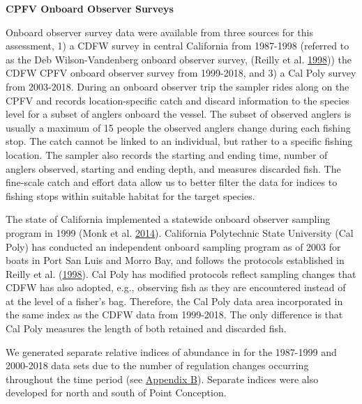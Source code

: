 \documentclass[12pt,]{article}
\begin{document}
\textbf{CPFV Onboard Observer Surveys}

Onboard observer survey data were available from three sources for this
assessment, 1) a CDFW survey in central California from 1987-1998
(referred to as the Deb Wilson-Vandenberg onboard observer survey,
(Reilly et al. \protect\hyperlink{ref-Reilly1998}{1998})) the CDFW CPFV
onboard observer survey from 1999-2018, and 3) a Cal Poly survey from
2003-2018. During an onboard observer trip the sampler rides along on
the CPFV and records location-specific catch and discard information to
the species level for a subset of anglers onboard the vessel. The subset
of observed anglers is usually a maximum of 15 people the observed
anglers change during each fishing stop. The catch cannot be linked to
an individual, but rather to a specific fishing location. The sampler
also records the starting and ending time, number of anglers observed,
starting and ending depth, and measures discarded fish. The fine-scale
catch and effort data allow us to better filter the data for indices to
fishing stops within suitable habitat for the target species.

The state of California implemented a statewide onboard observer
sampling program in 1999 (Monk et al.
\protect\hyperlink{ref-Monk2014}{2014}). California Polytechnic State
University (Cal Poly) has conducted an independent onboard sampling
program as of 2003 for boats in Port San Luis and Morro Bay, and follows
the protocols established in Reilly et al.
(\protect\hyperlink{ref-Reilly1998}{1998}). Cal Poly has modified
protocols reflect sampling changes that CDFW has also adopted, e.g.,
observing fish as they are encountered instead of at the level of a
fisher's bag. Therefore, the Cal Poly data area incorporated in the same
index as the CDFW data from 1999-2018. The only difference is that Cal
Poly measures the length of both retained and discarded fish.

We generated separate relative indices of abundance in for the 1987-1999
and 2000-2018 data sets due to the number of regulation changes
occurring throughout the time period (see
\protect\hyperlink{appendix-b.-californias-recreational-fishery-regulations}{Appendix
B}). Separate indices were also developed for north and south of Point
Conception.
\end{document}
